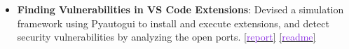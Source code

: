 \documentclass[10pt,a4paper,calibri]{moderncv}
\newcommand{\mediumspace}{\vspace{0.5em}}
\begin{document}
\begin{itemize}
  \item \textbf{Finding Vulnerabilities in VS Code Extensions}: Devised a simulation framework using Pyautogui 
  to install and execute extensions, and detect security vulnerabilities by analyzing the open ports.
  \href{https://drive.google.com/file/d/1SUWsf2YVB4lKOOoEUgAEGc34aK5barhC/view?usp=sharing}{[\textcolor{blueviolet}{report}]}
  \href{https://github.com/prateekdceit06/VSCode-Extensions-Simulator}{[\textcolor{blueviolet}{readme}]}
\end{itemize}




  
\end{document}
